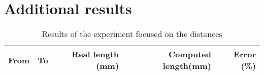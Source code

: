 \chapter{Additional results}

\begin{table}
\centering
\begin{tabular}{|r|r|r|r|r|}
\hline
From    & To    & Real length (mm) & Computed length(mm) & Error (\%) \\
\hline
\hline

\hline
\end{tabular}
\label{table:distances-second}
\caption{Results of the experiment focused on the distances}
\end{table}
